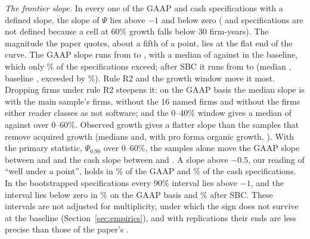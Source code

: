 \emph{The frontier slope.} In every one of the \ScPsiOpN{} GAAP and \ScPsiCashN{} cash specifications with a defined slope, the slope of $\Psi$ lies above $-1$ and below zero (\ScPsiOpInv{} and \ScPsiCashInv{} specifications are not defined because a cell at 60\% growth falls below 30 firm-years). The magnitude the paper quotes, about a fifth of a point, lies at the flat end of the curve. The GAAP slope runs from \ScPsiOpMin{} to \ScPsiOpMax, with a median of \ScPsiOpMed{} against \ScPsiOpBase{} in the baseline, which only \ScPsiOpAboveBase\% of the specifications exceed; after SBC it runs from \ScPsiCashMin{} to \ScPsiCashMax{} (median \ScPsiCashMed, baseline \ScPsiCashBase, exceeded by \ScPsiCashAboveBase\%). Rule R2 and the growth window move it most. Dropping firms under rule R2 steepens it: on the GAAP basis the median slope is \ScPsiOpRtwoMainMed{} with the main sample's firms, \ScPsiOpRtwoNamedMed{} without the 16 named firms and \ScPsiOpRtwoEitherMed{} without the firms either reader classes as not software; and the 0--40\% window gives a median of \ScPsiOpWinFortyMed{} against \ScPsiOpWinSixtyMed{} over 0--60\%. Observed growth gives a flatter slope than the samples that remove acquired growth (medians \ScPsiOpObsMed{} and, with pro forma organic growth, \ScPsiOpProMed). With the primary statistic, $\Psi_{0.90}$ over 0--60\%, the samples alone move the GAAP slope between \ScPsiOpPrimMin{} and \ScPsiOpPrimMax{} and the cash slope between \ScPsiCashPrimMin{} and \ScPsiCashPrimMax. A slope above $-0.5$, our reading of ``well under a point'', holds in \ScPsiOpShareHalf\% of the GAAP and \ScPsiCashShareHalf\% of the cash specifications. In the bootstrapped specifications every 90\% interval lies above $-1$, and the interval lies below zero in \ScPsiOpBootNeg\% on the GAAP basis and \ScPsiCashBootNeg\% after SBC. These intervals are not adjusted for multiplicity, under which the sign does not survive at the baseline (Section~\ref{sec:empirics}), and with \ScBootB{} replications their ends are less precise than those of the paper's \BootB.

